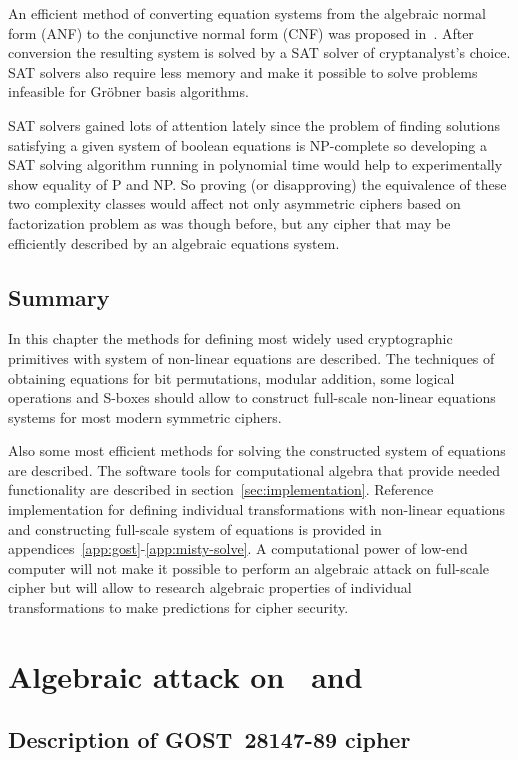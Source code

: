 An efficient method of converting equation systems from the algebraic normal
form (ANF) to the conjunctive normal form (CNF) was proposed
in~\cite{cryptoeprint-2007-024}. After conversion the resulting system is
solved by a SAT solver of cryptanalyst's choice. SAT solvers also require less
memory and make it possible to solve problems infeasible for Gr\"obner basis
algorithms.

SAT solvers gained lots of attention lately since the problem of finding
solutions satisfying a given system of boolean equations is \mbox{NP-complete} 
so developing a SAT solving algorithm running in polynomial time would help to
experimentally show equality of P and NP. So proving (or disapproving) the
equivalence of these two complexity classes would affect not only asymmetric
ciphers based on factorization problem as was though before, but any cipher that
may be efficiently described by an algebraic equations system.


\section{Summary}

In this chapter the methods for defining most widely used cryptographic
primitives with system of non-linear equations are described. The techniques of
obtaining equations for bit permutations, modular addition, some logical
operations and S-boxes should allow to construct full-scale non-linear equations
systems for most modern symmetric ciphers.

Also some most efficient methods for solving the constructed system of equations
are described. The software tools for computational algebra that provide needed
functionality are described in section~\ref{sec:implementation}. Reference
implementation for defining individual transformations with non-linear equations
and constructing full-scale system of equations is provided in
appendices~\ref{app:gost}-\ref{app:misty-solve}. A computational power of
low-end computer will not make it possible to perform an algebraic attack on
full-scale cipher but will allow to research algebraic properties of individual
transformations to make predictions for cipher security.


\chapter{Algebraic attack on \gost\ and \misty}


\section{Description of GOST~28147-89 cipher}
\label{sec:algebraic-gost}

